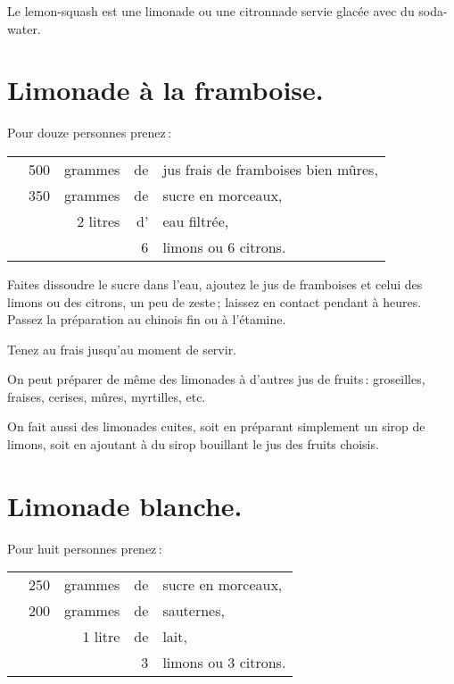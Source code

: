 \sk

Le lemon-squash est une limonade ou une citronnade servie glacée avec du
soda-water.

\section*{\centering Limonade à la framboise.}
{}

Pour douze personnes prenez :

\footnotesize
\begin{longtable}{rrrrp{16em}}
  & 500 & grammes & de & jus frais de framboises bien mûres,                                              \\
  & 350 & grammes & de & sucre en morceaux,                                                               \\
  & \multicolumn{2}{r}{2 litres} & d' & eau filtrée,                                                      \\
  &     &         &  6 & limons ou 6 citrons.                                                             \\
\end{longtable}
\normalsize

Faites dissoudre le sucre dans l'eau, ajoutez le jus de framboises et celui des
limons ou des citrons, un peu de zeste ; laissez en contact pendant {\mmm}
à {\mmm} heures. Passez la préparation au chinois fin ou à l'étamine.

Tenez au frais jusqu'au moment de servir.

\sk

On peut préparer de même des limonades à d'autres jus de fruits : groseilles,
fraises, cerises, mûres, myrtilles, etc.

\sk

On fait aussi des limonades cuites, soit en préparant simplement un sirop de
limons, soit en ajoutant à du sirop bouillant le jus des fruits choisis.

\section*{\centering Limonade blanche.}
{}

Pour huit personnes prenez :

\footnotesize
\begin{longtable}{rrrrp{16em}}
  & 250 & grammes & de & sucre en morceaux,                                                               \\
  & 200 & grammes & de & sauternes,                                                                       \\
  & \multicolumn{2}{r}{1 litre} & de & lait,                                                              \\
  &     &         &  3 & limons ou 3 citrons.                                                             \\
\end{longtable}
\normalsize

